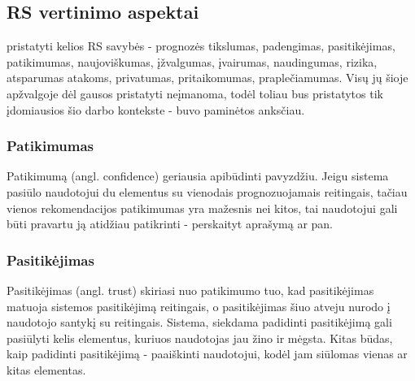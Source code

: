 \documentclass{VUMIFInfMagistrinis}
\begin{document}
\subsection{RS vertinimo aspektai}
\cite{3} pristatyti kelios RS savybės - prognozės tikslumas, padengimas, pasitikėjimas, patikimumas, naujoviškumas, įžvalgumas, įvairumas, naudingumas, rizika, atsparumas atakoms, privatumas, pritaikomumas, praplečiamumas. Visų jų šioje apžvalgoje dėl gausos pristatyti neįmanoma, todėl toliau bus pristatytos tik įdomiausios šio darbo kontekste - buvo paminėtos anksčiau.
\subsubsection{Patikimumas}
Patikimumą (angl. confidence) geriausia apibūdinti pavyzdžiu. Jeigu sistema pasiūlo naudotojui du elementus su vienodais prognozuojamais reitingais, tačiau vienos rekomendacijos patikimumas yra mažesnis nei kitos, tai naudotojui gali būti pravartu ją atidžiau patikrinti - perskaityt aprašymą ar pan. 
\subsubsection{Pasitikėjimas}
Pasitikėjimas (angl. trust) skiriasi nuo patikimumo tuo, kad pasitikėjimas matuoja sistemos pasitikėjimą reitingais, o pasitikėjimas šiuo atveju nurodo į naudotojo santykį su reitingais. Sistema, siekdama padidinti pasitikėjimą gali pasiūlyti kelis elementus, kuriuos naudotojas jau žino ir mėgsta. Kitas būdas, kaip padidinti pasitikėjimą - paaiškinti naudotojui, kodėl jam siūlomas vienas ar kitas elementas.
\end{document}
